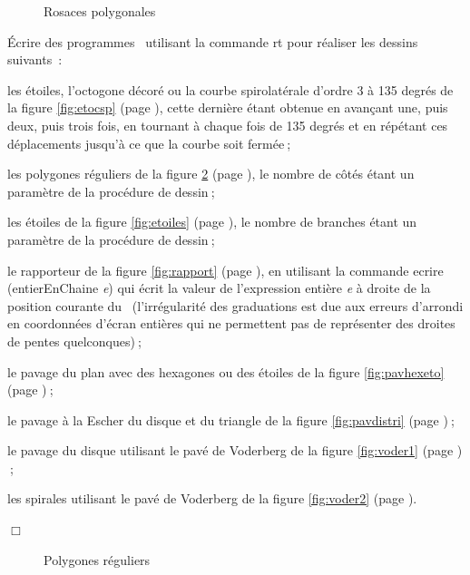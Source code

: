 \begin{figure}[htbp]
 \caption{Rosaces polygonales}\label{fig:rospol}
\end{figure}
\begin{exercices}{Écrire des programmes \ocaml\  utilisant la commande {\idt rt}
pour réaliser les dessins suivants~:

\tiret les étoiles, l'octogone décoré ou la courbe spirolatérale d'ordre 3 à 135 degrés de la figure 
         \ref{fig:etocsp} (page \pageref{fig:etocsp}), cette dernière étant obtenue en avançant une, puis deux, puis
		 trois fois, en tournant à chaque fois de 135 degrés et en répétant ces déplacements jusqu'à ce que
		 la courbe soit fermée$\:$;

\tiret les polygones réguliers de la figure 
         \ref{fig:polyreg} (page \pageref{fig:polyreg}), le nombre de côtés étant un paramètre de la procédure
		 de dessin$\:$;

\tiret les étoiles de la figure 
         \ref{fig:etoiles} (page \pageref{fig:etoiles}), le nombre de branches étant un paramètre de la procédure
		 de dessin$\:$;

\tiret le rapporteur de la figure 
         \ref{fig:rapport} (page \pageref{fig:rapport}), en utilisant la commande
		 {\idt ecrire (entierEnChaine} {\em e}{\idt )} qui écrit la valeur de l'expression entière {\em e}
		 à droite de la position courante du \robot\ (l'irrégularité des graduations
		 est due aux erreurs d'arrondi en coordonnées d'écran entières qui ne permettent pas de
		 représenter des droites de pentes quelconques)$\:$;

\tiret le pavage du plan avec des hexagones ou des étoiles de la figure 
         \ref{fig:pavhexeto} (page \pageref{fig:pavhexeto})$\:$;

\tiret le pavage à la Escher \cite{escher1} du disque et du triangle de la figure 
         \ref{fig:pavdistri} (page \pageref{fig:pavdistri})$\:$;

\tiret le pavage du disque utilisant le pavé de Voderberg \cite{voderberg} de la figure 
         \ref{fig:voder1} (page \pageref{fig:voder1})$\:$;

\tiret les spirales utilisant le pavé de Voderberg \cite{voderberg} de la 
         figure \ref{fig:voder2} (page \pageref{fig:voder2}).

\noindent $\Box$}\end{exercices}
\begin{figure}[htbp]
 \caption{Polygones réguliers}\label{fig:polyreg}
\end{figure}
